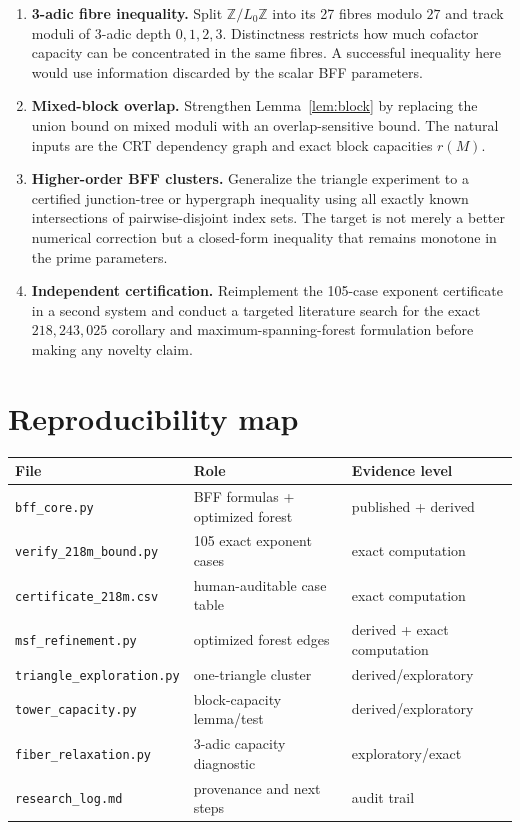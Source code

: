\documentclass[11pt]{article}
\theoremstyle{definition}
\newcommand{\Z}{\mathbb Z}
\begin{document}
\begin{enumerate}[label=\arabic*.]
\item \textbf{3-adic fibre inequality.}  Split $\Z/L_0\Z$ into its 27 fibres modulo $27$ and
track moduli of 3-adic depth $0,1,2,3$.  Distinctness restricts how much cofactor capacity can be
concentrated in the same fibres.  A successful inequality here would use information discarded
by the scalar BFF parameters.

\item \textbf{Mixed-block overlap.}  Strengthen Lemma~\ref{lem:block} by replacing the union
bound on mixed moduli with an overlap-sensitive bound.  The natural inputs are the CRT
dependency graph and exact block capacities $r(M)$.

\item \textbf{Higher-order BFF clusters.}  Generalize the triangle experiment to a certified
junction-tree or hypergraph inequality using all exactly known intersections of pairwise-disjoint
index sets.  The target is not merely a better numerical correction but a closed-form inequality
that remains monotone in the prime parameters.

\item \textbf{Independent certification.}  Reimplement the 105-case exponent certificate in a
second system and conduct a targeted literature search for the exact $218{,}243{,}025$ corollary
and maximum-spanning-forest formulation before making any novelty claim.
\end{enumerate}

\section{Reproducibility map}

\begin{center}
\begin{tabular}{lll}
\toprule
File & Role & Evidence level\\
\midrule
\texttt{bff\_core.py} & BFF formulas + optimized forest & published + derived\\
\texttt{verify\_218m\_bound.py} & 105 exact exponent cases & exact computation\\
\texttt{certificate\_218m.csv} & human-auditable case table & exact computation\\
\texttt{msf\_refinement.py} & optimized forest edges & derived + exact computation\\
\texttt{triangle\_exploration.py} & one-triangle cluster & derived/exploratory\\
\texttt{tower\_capacity.py} & block-capacity lemma/test & derived/exploratory\\
\texttt{fiber\_relaxation.py} & 3-adic capacity diagnostic & exploratory/exact\\
\texttt{research\_log.md} & provenance and next steps & audit trail\\
\bottomrule
\end{tabular}
\end{center}



\end{document}
